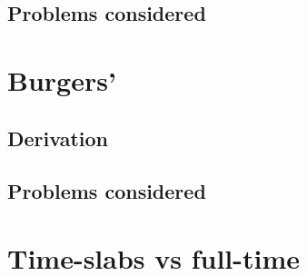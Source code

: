 \documentclass[Proposal.tex]{subfiles}
\begin{document}
\subsection{Problems considered}


\section{Burgers'}

\subsection{Derivation}

\subsection{Problems considered}


\section{Time-slabs vs full-time}
\end{document}
